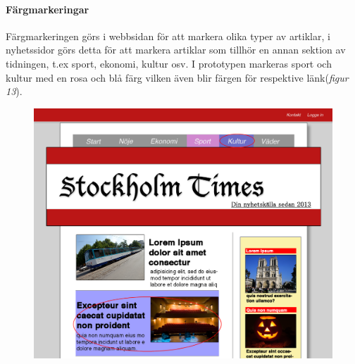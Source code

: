 \documentclass[11pt]{article}
\begin{document}
\paragraph{Färgmarkeringar}\mbox{}

Färgmarkeringen görs i webbsidan för att markera olika typer av artiklar, i nyhetssidor görs detta för att markera artiklar som tillhör en annan sektion av tidningen, t.ex sport, ekonomi, kultur osv. I prototypen markeras sport och kultur med en rosa och blå färg vilken även blir färgen för respektive länk(\textit{figur 13}).
\\

\begin{figure}[H]
\centerline{%
\includegraphics[scale=0.25]{pics/fargdesktop.png}\hspace{2em}%
}
\end{figure}
\end{document}

